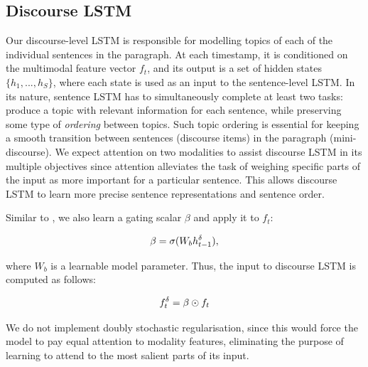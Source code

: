 \documentclass[11pt,a4paper]{article}
\begin{document}
\subsection{Discourse LSTM}
Our discourse-level LSTM is responsible for modelling topics of each of the individual sentences in the paragraph.
At each timestamp, it is conditioned on the multimodal feature vector $f_t$, and its output is a set of hidden states $\{h_1, ..., h_S\}$, where each state is used as an input to the sentence-level LSTM.
In its nature, sentence LSTM has to simultaneously complete at least two tasks: produce a topic with relevant information for each sentence, while preserving some type of \textit{ordering} between topics.
Such topic ordering is essential for keeping a smooth transition between sentences (discourse items) in the paragraph (mini-discourse).
We expect attention on two modalities to assist discourse LSTM in its multiple objectives since attention alleviates the task of weighing specific parts of the input as more important for a particular sentence.
This allows discourse LSTM to learn more precise sentence representations and sentence order.

Similar to , we also learn a gating scalar $\beta$ and apply it to $f_t$:

\begin{equation}
	\beta = \sigma(W_b h\sp{\delta}_{t-1}),
\end{equation}

where $W_b$ is a learnable model parameter.
Thus, the input to discourse LSTM is computed as follows:

\begin{equation}
	f_t\sp\delta = \beta \odot f_t
\end{equation}

We do not implement doubly stochastic regularisation, since this would force the model to pay equal attention to modality features, eliminating the purpose of learning to attend to the most salient parts of its input.
\end{document}
